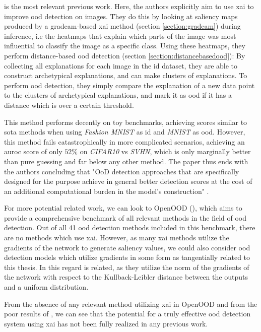 \documentclass[UKenglish]{uiomasterthesis} %
\theoremstyle{definition}
\begin{document}
\cite{martinez} is the most relevant previous work. Here, the authors explicitly aim to use \ac{xai} to improve \ac{ood} detection on images. They do this by looking at saliency maps produced by a \ac{gradcam}-based \ac{xai} method (section \ref{section:gradcam}) during inference, i.e the heatmaps that explain which parts of the image was most influential to classify the image as a specific class. Using these heatmaps, they perform distance-based \ac{ood} detection (section \ref{section:distancebasedood}): By collecting all explanations for each image in the \ac{id} dataset, they are able to construct archetypical explanations, and can make clusters of explanations. To perform \ac{ood} detection, they simply compare the explanation of a new data point to the clusters of archetypical explanations, and mark it as \ac{ood} if it has a distance which is over a certain threshold.

This method performs decently on toy benchmarks, achieving scores similar to \ac{sota} methods when using {\it Fashion MNIST} as \ac{id} and {\it MNIST} as \ac{ood}. However, this method fails catastrophically in more complicated scenarios, achieving an \ac{auroc} score of only $52\%$ on {\it CIFAR10} vs {\it SVHN}, which is only marginally better than pure guessing and far below any other method. The paper thus ends with the authors concluding that "OoD detection approaches that are specifically designed for the purpose achieve in general better detection scores at the cost of an additional computational burden in the model’s construction" \cite{martinez}.

For more potential related work, we can look to OpenOOD (\cite{openood}), which aims to provide a comprehensive benchmark of all relevant methods in the field of \ac{ood} detection. Out of all 41 \ac{ood} detection methods included in this benchmark, there are no methods which use \ac{xai}. However, as many \ac{xai} methods utilize the gradients of the network to generate saliency values, we could also consider \ac{ood} detection models which utilize gradients in some form as tangentially related to this thesis. In this regard \cite{gradnorm} is related, as they utilize the norm of the gradients of the network with respect to the Kullback-Leibler distance between the outputs and a uniform distribution.

From the absence of any relevant method utilizing \ac{xai} in OpenOOD and from the poor results of \cite{martinez}, we can see that the potential for a truly effective \ac{ood} detection system using \ac{xai} has not been fully realized in any previous work.
\end{document}
